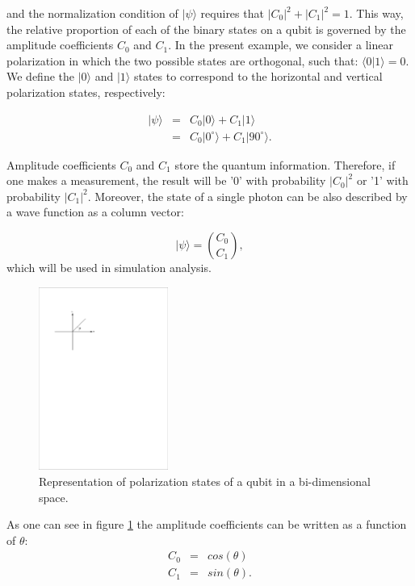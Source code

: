 and the normalization condition of $|\psi\rangle$ requires that $|C_0|^2+|C_1|^2=1$. This way, the relative proportion of each of the binary states on a qubit is governed by the amplitude coefficients $C_0$ and $C_1$. In the present example, we consider a linear polarization in which the two possible states are orthogonal, such that: $\langle 0|1 \rangle=0$. We define the $|0\rangle$ and $|1\rangle$ states to correspond to the horizontal and vertical polarization states, respectively:

\begin{eqnarray}
  |\psi\rangle &=& C_0 |0\rangle+C_1 |1\rangle \\
             &=& C_0 |0^{\circ}\rangle + C_1 |90^{\circ}\rangle .
\end{eqnarray}

Amplitude coefficients $C_0$ and $C_1$ store the quantum information. Therefore, if one makes a measurement, the result will be '0' with probability $|C_0|^2$ or '1' with probability $|C_1|^2$.
Moreover, the state of a single photon can be also described by a wave function as a column vector:

\begin{equation}\label{eq:wavefvector}
  |\psi\rangle = \binom{C_0}{C_1},
\end{equation}
which will be used in simulation analysis.

\begin{figure}[h]
    \centering
        \includegraphics[clip, trim=3cm 20cm 12cm 3cm, height=6cm]{./sdf/qrng/figures_raw/axis_states.pdf}
    \caption{Representation of polarization states of a qubit in a bi-dimensional space.}\label{fig:stateaxis}
\end{figure}

As one can see in figure \ref{fig:stateaxis} the amplitude coefficients can be written as a function of $\theta$:
\begin{eqnarray}
  C_0 &=& cos(\theta) \\
  C_1 &=& sin(\theta).
\end{eqnarray}

